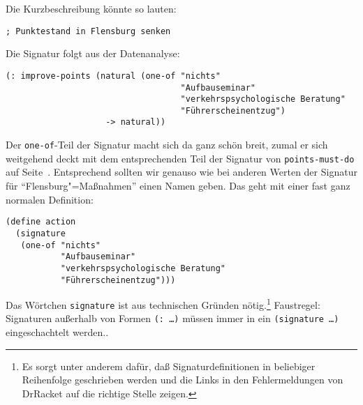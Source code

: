 Die Kurzbeschreibung könnte so lauten:
%
\begin{verbatim}
; Punktestand in Flensburg senken
\end{verbatim}
%
Die Signatur folgt aus der Datenanalyse:
%
\begin{verbatim}
(: improve-points (natural (one-of "nichts"
                                   "Aufbauseminar"
                                   "verkehrspsychologische Beratung"
                                   "Führerscheinentzug")
                    -> natural))
\end{verbatim}
%
Der \texttt{one-of}-Teil der Signatur macht sich da ganz schön breit,
zumal er sich weitgehend deckt mit dem entsprechenden Teil der
Signatur von \texttt{points-must-do} auf
Seite~\pageref{page:points-must-do}.  Entsprechend sollten wir genauso
wie bei anderen Werten der Signatur für "`Flensburg"=Maßnahmen"' einen
Namen geben.  Das geht mit einer fast ganz normalen Definition:
%
\begin{verbatim}
(define action
  (signature
   (one-of "nichts"
           "Aufbauseminar"
           "verkehrspsychologische Beratung"
           "Führerscheinentzug")))
\end{verbatim}
%
Das Wörtchen \texttt{signature}\label{page:signature} ist aus technischen Gründen
nötig.\footnote{Es sorgt unter anderem dafür, daß Signaturdefinitionen
  in beliebiger Reihenfolge geschrieben werden und die Links in den
  Fehlermeldungen von DrRacket auf die richtige Stelle zeigen.}
Faustregel: Signaturen außerhalb von Formen \texttt{(: \ldots)} müssen immer in ein \texttt{(signature
  \ldots)} eingeschachtelt werden..

